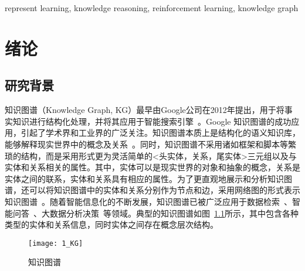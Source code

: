 \documentclass[algorithmlist, AutoFakeBold, AutoFakeSlant, figurelist, tablelist, nomlist, masters]{seuthesix}
\begin{document}
\begin{englishabstract}{represent learning, knowledge reasoning, reinforcement learning, knowledge graph}

\end{englishabstract} 

\tableofcontents
\mainmatter  %

\chapter{绪论}
\section{研究背景}
知识图谱（Knowledge Graph, KG）最早由Google公司在2012年提出，用于将事实知识进行结构化处理，并将其应用于智能搜索引擎~\cite{singhal_2012}。Google 知识图谱的成功应用，引起了学术界和工业界的广泛关注。知识图谱本质上是结构化的语义知识库，能够解释现实世界中的概念及关系~\cite{nickel2015review}。同时，知识图谱不采用诸如框架和脚本等繁琐的结构，而是采用形式更为灵活简单的<头实体，关系，尾实体>三元组以及与实体和关系相关的属性。其中，实体可以是现实世界的对象和抽象的概念，关系是实体之间的联系，实体和关系具有相应的属性。为了更直观地展示和分析知识图谱，还可以将知识图谱中的实体和关系分别作为节点和边，采用网络图的形式表示知识图谱~\cite{noy2019industry}。随着智能信息化的不断发展，知识图谱已被广泛应用于数据检索~\cite{rinaldi2021semantic,sarhan2021open,li2021research}、智能问答~\cite{li2021improving,do2021developing}、大数据分析决策~\cite{zhou2021geoscience,abu2021relational}等领域。典型的知识图谱如图~\ref{1_KG}所示，其中包含各种类型的实体和关系信息，同时实体之间存在概念层次结构。

\begin{figure}
  \centering
  \texttt{[image: 1\_KG]}
  \caption{知识图谱}
  \label{1_KG}
\end{figure}
\end{document}
